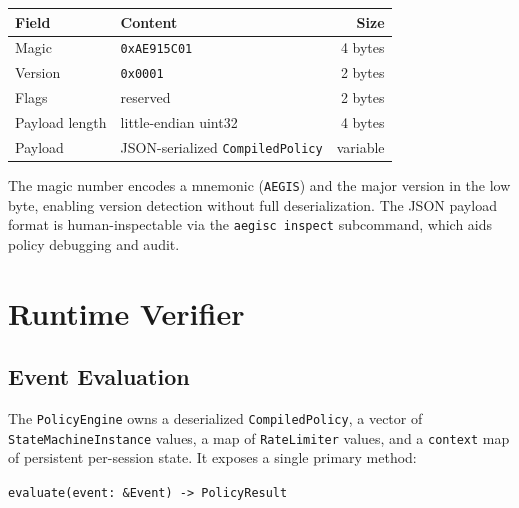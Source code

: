 \documentclass[sigconf]{acmart}
\begin{document}
\begin{center}
\begin{tabular}{llr}
\toprule
Field & Content & Size \\
\midrule
Magic & \texttt{0xAE915C01} & 4 bytes \\
Version & \texttt{0x0001} & 2 bytes \\
Flags & reserved & 2 bytes \\
Payload length & little-endian uint32 & 4 bytes \\
Payload & JSON-serialized \texttt{CompiledPolicy} & variable \\
\bottomrule
\end{tabular}
\end{center}

\noindent The magic number encodes a mnemonic (\texttt{AEGIS}) and the major
version in the low byte, enabling version detection without full deserialization.
The JSON payload format is human-inspectable via the \texttt{aegisc inspect}
subcommand, which aids policy debugging and audit.


\section{Runtime Verifier}
\label{sec:runtime}

\subsection{Event Evaluation}

The \texttt{PolicyEngine} owns a deserialized \texttt{CompiledPolicy}, a vector
of \texttt{StateMachineInstance} values, a map of \texttt{RateLimiter} values,
and a \texttt{context} map of persistent per-session state. It exposes a single
primary method:

\begin{center}
\texttt{evaluate(event: \&Event) -> PolicyResult}
\end{center}
\end{document}
